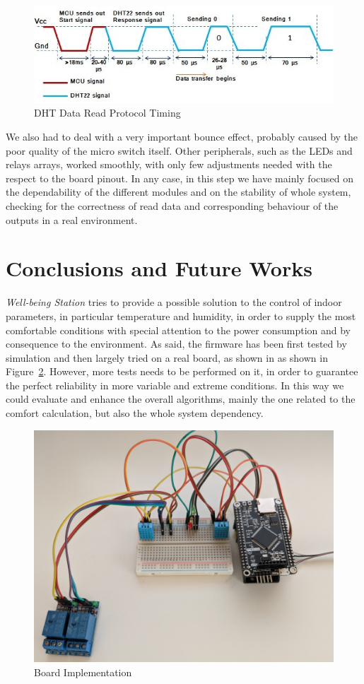 \documentclass[peerreview]{IEEEtran}
\begin{document}
	\begin{figure}[!htbp]
		\centering
		\includegraphics[width=0.9\columnwidth]{dht_timing} 
		\caption{DHT Data Read Protocol Timing}
		\label{fig:dht_timing}
	\end{figure}

	We also had to deal with a very important bounce effect, probably caused by
	the poor quality of the micro switch itself. Other peripherals, such as the
	LEDs and relays	arrays, worked smoothly, with only few adjustments needed
	with the respect to the board pinout. In any case, in this step we have
	mainly focused on the dependability of the different modules and on the
	stability of whole system, checking for the correctness of read data and
	corresponding behaviour of the outputs in a real environment. 

\section{Conclusions and Future Works}
\emph{Well-being Station} tries to provide a possible solution to the control of
indoor parameters, in particular temperature and humidity, in order to supply
the most comfortable conditions with special attention to the power consumption
and by consequence to the environment. As said, the firmware has been first tested
by simulation and then largely tried on a real board, as shown in as shown in
Figure~\ref{fig:board_impl}. However, more tests needs to be performed on
it, in order to guarantee the perfect reliability in more variable and extreme
conditions. In this way we could evaluate and enhance the overall algorithms,
mainly the one related to the comfort calculation, but also the whole system
dependency.

\begin{figure}[!htbp]
	\centering
	\includegraphics[width=0.7\columnwidth]{board_impl} 
	\caption{Board Implementation}
	\label{fig:board_impl}
\end{figure}
\end{document}
